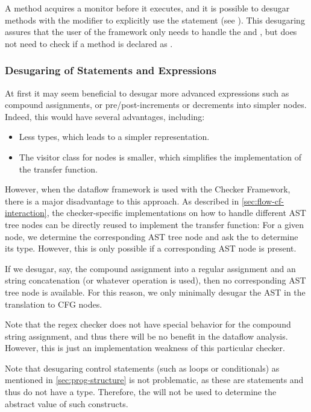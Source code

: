 A  method acquires a monitor before it executes, and it is possible
to desugar methods with the  modifier to explicitly use
the  statement (see ). This desugaring
assures that the user of the framework only needs to handle the
 and ,
but does not need to check if a method is declared as
.



\begin{new}

\subsubsection{Desugaring of Statements and Expressions}

At first it may seem beneficial to desugar more advanced expressions such as compound
assignments, or pre/post-increments or decrements into simpler nodes.  Indeed, this would
have several advantages, including:
\begin{itemize}
    \item Less  types, which leads to a simpler representation.
    \item The visitor class for nodes is smaller, which simplifies the implementation
    of the transfer function.
\end{itemize}
However, when the dataflow framework is used with the Checker Framework, there is a major
disadvantage to this approach.  As described in \autoref{sec:flow-cf-interaction}, the
checker-specific implementations on how to handle different AST tree nodes can be directly
reused to implement the transfer function:  For a given node, we determine the corresponding
AST tree node and ask the  to determine its type.  However, this
is only possible if a corresponding AST node is present.

If we desugar, say, the compound assignment into a regular assignment and an string concatenation
(or whatever operation is used), then no corresponding AST tree node is available.
For this reason, we only minimally desugar the AST in the translation to
CFG nodes.

\begin{workinprogress}
    Note that the regex checker does not have special behavior for the compound string
    assignment, and thus there will be no benefit in the dataflow analysis.  However,
    this is just an implementation weakness of this particular checker.
\end{workinprogress}

Note that desugaring control statements (such as loops or conditionals) as mentioned
in \autoref{sec:prog-structure} is not problematic, as these are statements and thus do not
have a type.  Therefore, the  will not be used to determine
the abstract value of such constructs.


\end{new}


